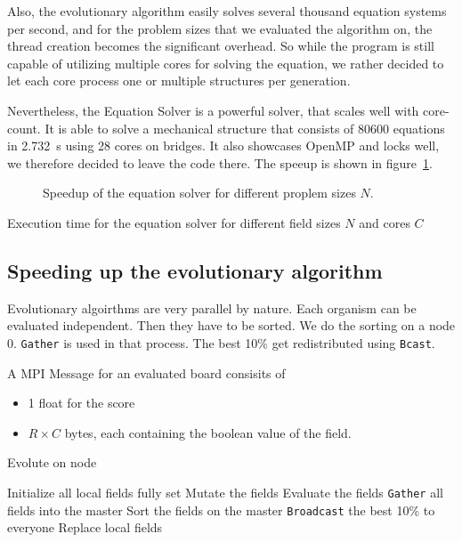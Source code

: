 \documentclass[12pt]{article}
\begin{document}
Also, the evolutionary algorithm easily solves several thousand equation systems per second, and for the problem sizes that we evaluated the algorithm on, the thread creation becomes the significant overhead. So while the program is still capable of utilizing multiple cores for solving the equation, we rather decided to let each core process one or multiple structures per generation.

Nevertheless, the Equation Solver is a powerful solver, that scales well with core-count. It is able to solve a mechanical structure that consists of 80600 equations in \SI{2.732}{\second} using 28 cores on bridges. It also showcases OpenMP and locks well, we therefore decided to leave the code there. The speeup is shown in figure~\ref{fig:Speedup}.

\begin{figure}[p]
    \centering
    
    \caption{Speedup of the equation solver for different proplem sizes $N$.}
    \label{fig:Speedup}
\end{figure}

\begin{table}[p]
    \centering
    
    \caption{Execution time for the equation solver for different field sizes $N$ and cores $C$}
    \label{tab:Speedup}
\end{table}

\subsection{Speeding up the evolutionary algorithm}

Evolutionary algoirthms are very parallel by nature. Each organism can be evaluated independent. Then they have to be sorted. We do the sorting on a node 0. \texttt{Gather} is used in that process. The best 10\% get redistributed using \texttt{Bcast}.

A MPI Message for an evaluated board consisits of

\begin{itemize}
    \item 1 float for the score
    \item $R \times C$ bytes, each containing the boolean value of the field.
\end{itemize}

\begin{algorithm}[p]
    \caption{Evolute on node}
    \begin{algorithmic}
        \STATE Initialize all local fields fully set
            \STATE Mutate the fields
            \STATE Evaluate the fields
            \STATE \texttt{Gather} all fields into the master
            \STATE Sort the fields on the master
            \STATE \texttt{Broadcast} the best 10\% to everyone
            \STATE Replace local fields
        \ENDFOR
    \end{algorithmic}
    \label{alg:Evolution}
\end{algorithm}
\end{document}
